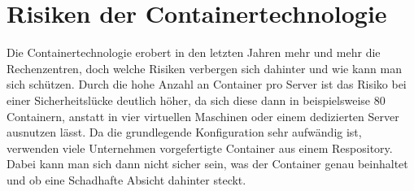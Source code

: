 \section{Risiken der Containertechnologie}
\label{sec:Risiken der Containertechnologie}
Die Containertechnologie erobert in den letzten Jahren mehr und mehr die Rechenzentren, doch welche Risiken verbergen sich dahinter und wie kann man sich schützen. \newline
Durch die hohe Anzahl an Container pro Server ist das Risiko bei einer Sicherheitslücke deutlich höher, da sich diese dann in beispielsweise 80 Containern, anstatt in vier virtuellen Maschinen oder einem dedizierten Server ausnutzen lässt. Da die grundlegende Konfiguration sehr aufwändig ist, verwenden viele Unternehmen vorgefertigte Container aus einem Respository. Dabei kann man sich dann nicht sicher sein, was der Container genau beinhaltet und ob eine Schadhafte Absicht dahinter steckt. 
